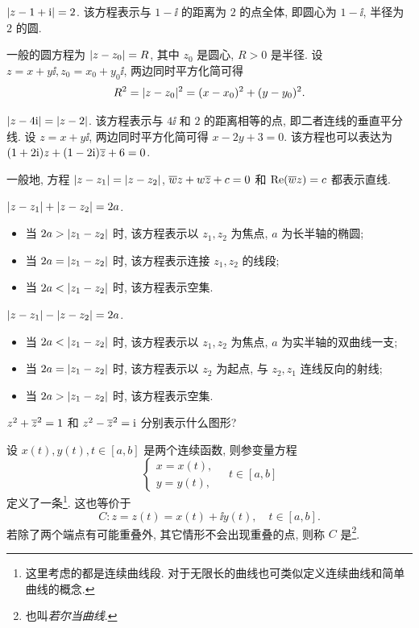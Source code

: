 \begin{exampleenum}
  \item $\lvert z-1+\mathrm{i}\rvert=2$. 该方程表示与 $1-\ii$ 的距离为 $2$ 的点全体, 即圆心为 $1-\ii$, 半径为 $2$ 的圆.
  
  一般的圆方程为 $\lvert z-z_0\rvert=R$, 其中 $z_0$ 是圆心, $R>0$ 是半径.
  设 $z=x+y\ii,z_0=x_0+y_0\ii$, 两边同时平方化简可得
  \[
    R^2=\lvert z-z_0\rvert^2=(x-x_0)^2+(y-y_0)^2.
  \]
  \item $\lvert z-4\mathrm{i}\rvert=\lvert z-2\rvert$. 该方程表示与 $4\ii$ 和 $2$ 的距离相等的点, 即二者连线的垂直平分线.
  设 $z=x+y\ii$, 两边同时平方化简可得 $x-2y+3=0$.
  该方程也可以表达为 $(1+2\mathrm{i})z+(1-2\mathrm{i})\overline z+6=0$.

  一般地, 方程 $\lvert z-z_1\rvert=\lvert z-z_2\rvert$, $\overline w z+w\overline z+c=0$ 和 $\operatorname{Re}(\overline wz)=c$ 都表示直线.
  \item $\lvert z-z_1\rvert+\lvert z-z_2\rvert=2a$.
  \begin{itemize}
    \item 当 $2a>\lvert z_1-z_2\rvert$ 时, 该方程表示以 $z_1,z_2$ 为焦点, $a$ 为长半轴的椭圆;
    \item 当 $2a=\lvert z_1-z_2\rvert$ 时, 该方程表示连接 $z_1,z_2$ 的线段;
    \item 当 $2a<\lvert z_1-z_2\rvert$ 时, 该方程表示空集.
  \end{itemize}
  \item $\lvert z-z_1\rvert-\lvert z-z_2\rvert=2a$.
  \begin{itemize}
    \item 当 $2a<\lvert z_1-z_2\rvert$ 时, 该方程表示以 $z_1,z_2$ 为焦点, $a$ 为实半轴的双曲线一支;
    \item 当 $2a=\lvert z_1-z_2\rvert$ 时, 该方程表示以 $z_2$ 为起点, 与 $z_2,z_1$ 连线反向的射线;
    \item 当 $2a>\lvert z_1-z_2\rvert$ 时, 该方程表示空集.
  \end{itemize}
\end{exampleenum}

\begin{exercise}
  $z^2+\overline z^2=1$ 和 $z^2-\overline z^2=\mathrm{i}$ 分别表示什么图形?
\end{exercise}

设 $x(t),y(t),t\in[a,b]$ 是两个连续函数,
则参变量方程
\[
  \begin{cases}
    x=x(t),\\
    y=y(t),
  \end{cases}\quad 
  t\in[a,b]
\]
定义了一条\footnote{%
  这里考虑的都是连续曲线段. 对于无限长的曲线也可类似定义连续曲线和简单曲线的概念.
}.
这也等价于
\[
  C:z=z(t)=x(t)+\ii y(t),\quad t\in[a,b].
\]
若除了两个端点有可能重叠外, 其它情形不会出现重叠的点, 则称 $C$ 是\footnote{%
  也叫\emph{若尔当曲线}.
}.


